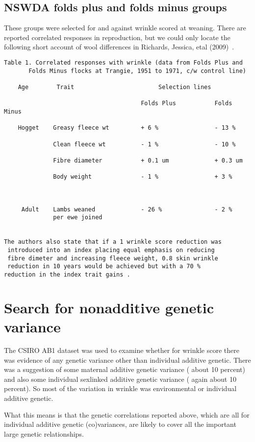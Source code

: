 \documentclass[titlepage]{article}  %
\begin{document}
\subsection{NSWDA folds plus and folds minus groups}
These groups were selected for and against wrinkle scored at weaning. There are reported correlated responses in reproduction, but we could only locate the following short account of wool differences in Richards, Jessica, etal (2009)~\cite{rich:09}.
\begin{verbatim}
Table 1. Correlated responses with wrinkle (data from Folds Plus and
       Folds Minus flocks at Trangie, 1951 to 1971, c/w control line)

    Age        Trait                        Selection lines

                                       Folds Plus           Folds Minus

    Hogget    Greasy fleece wt         + 6 %                - 13 %

              Clean fleece wt          - 1 %                - 10 %

              Fibre diameter           + 0.1 um             + 0.3 um

              Body weight              - 1 %                + 3 %

 

     Adult    Lambs weaned             - 26 %               - 2 %
              per ewe joined


The authors also state that if a 1 wrinkle score reduction was
 introduced into an index placing equal emphasis on reducing
 fibre dimeter and increasing fleece weight, 0.8 skin wrinkle
 reduction in 10 years would be achieved but with a 70 % 
reduction in the index trait gains .
\end{verbatim}

\section{Search for nonadditive genetic variance}
The CSIRO AB1 dataset was used to examine whether for wrinkle score there was evidence of any genetic variance other than individual additive genetic. There was a suggestion of some maternal additive genetic variance ( about 10 percent) and also some individual sexlinked additive genetic variance ( again about 10 percent). So most of the variation in wrinkle was environmental or individual additive genetic. 

What this means is that the genetic correlations reported above, which are all for individual additive genetic (co)variances, are likely to cover all the important large genetic relationships. 
\end{document}
